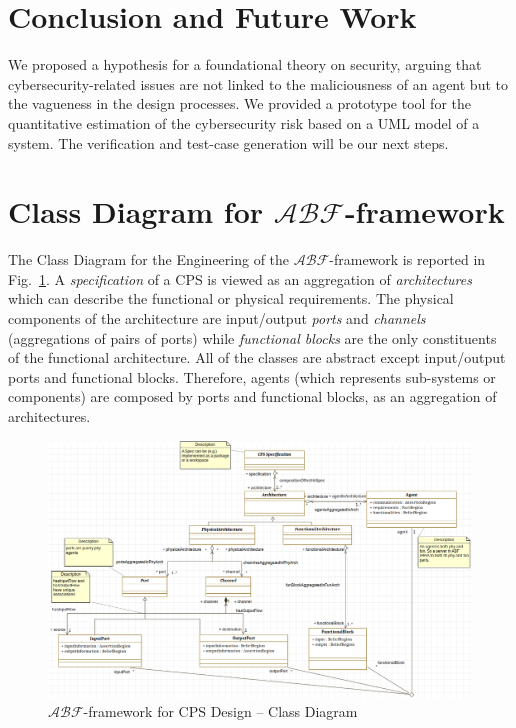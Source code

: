 \documentclass[runningheads]{llncs}
\newcommand{\assertionRegion}{\mathcal{A}}
\newcommand{\beliefRegion}{\mathcal{B}}
\newcommand{\factRegion}{\mathcal{F}}
\newcommand{\abftheory}{\assertionRegion\beliefRegion\factRegion}
\begin{document}
\section{Conclusion and Future Work}
We proposed a hypothesis for a foundational theory on security, arguing that
cybersecurity-related issues are not linked to the maliciousness of an agent
but to the vagueness in the design processes.  We provided a prototype
tool for the quantitative estimation of the cybersecurity risk based on a UML
model of a system.
The verification and test-case generation will be our next steps.

\printbibliography

\appendix
\section{Class Diagram for $\abftheory$-framework}
The Class Diagram for the Engineering of the $\abftheory$-framework is reported in
Fig.~\ref{fig:secraclassdiagram}. A \emph{specification} of a CPS is viewed
as an aggregation of \emph{architectures} which can describe the functional or
physical requirements. The physical components of the architecture are
input/output \emph{ports} and \emph{channels} (aggregations of pairs of ports)
while \emph{functional blocks} are the only constituents of the functional
architecture. All of the classes are abstract except input/output ports and
functional blocks. Therefore, agents (which represents sub-systems or
components) are composed by ports and functional blocks, as an aggregation of 
architectures.

\begin{figure}
	\centering
	\includegraphics[width=\textwidth]{secra_classDiagram.png}
	\caption{$\abftheory$-framework for CPS Design -- Class Diagram}
	\label{fig:secraclassdiagram}
\end{figure}
\end{document}

